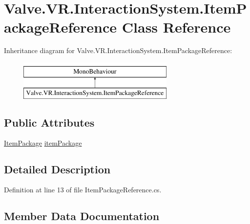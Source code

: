\hypertarget{class_valve_1_1_v_r_1_1_interaction_system_1_1_item_package_reference}{}\section{Valve.\+V\+R.\+Interaction\+System.\+Item\+Package\+Reference Class Reference}
\label{class_valve_1_1_v_r_1_1_interaction_system_1_1_item_package_reference}
Inheritance diagram for Valve.\+V\+R.\+Interaction\+System.\+Item\+Package\+Reference\+:\begin{figure}[H]
\begin{center}
\leavevmode
\includegraphics[height=2.000000cm]{class_valve_1_1_v_r_1_1_interaction_system_1_1_item_package_reference}
\end{center}
\end{figure}
\subsection*{Public Attributes}
\begin{DoxyCompactItemize}
\item 
\mbox{\hyperlink{class_valve_1_1_v_r_1_1_interaction_system_1_1_item_package}{Item\+Package}} \mbox{\hyperlink{class_valve_1_1_v_r_1_1_interaction_system_1_1_item_package_reference_a69090c43467f5e32692c0e6379c4c970}{item\+Package}}
\end{DoxyCompactItemize}


\subsection{Detailed Description}


Definition at line 13 of file Item\+Package\+Reference.\+cs.



\subsection{Member Data Documentation}
\mbox{\label{class_valve_1_1_v_r_1_1_interaction_system_1_1_item_package_reference_a69090c43467f5e32692c0e6379c4c970}} 
